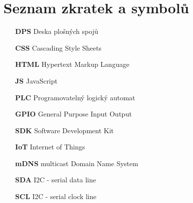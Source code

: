 \chapter*{Seznam zkratek a symbolů}
\label{chap:loa}
\begin{itemize}
    \item[\textbf{DPS}] Deska plošných spojů

    \item[\textbf{CSS}] Cascading Style Sheets

    \item[\textbf{HTML}] Hypertext Markup Language

    \item[\textbf{JS}] JavaScript

    \item[\textbf{PLC}] Programovatelný logický automat

    \item[\textbf{GPIO}] General Purpose Input Output

    \item[\textbf{SDK}] Software Development Kit

    \item[\textbf{IoT}] Internet of Things

    \item[\textbf{mDNS}] multicast Domain Name System

    \item[\textbf{SDA}] I2C - serial data line

    \item[\textbf{SCL}] I2C - serial clock line
\end{itemize}

\printbibliography[heading=bibintoc,title={Seznam zdrojů}]

\listoffigures

%
